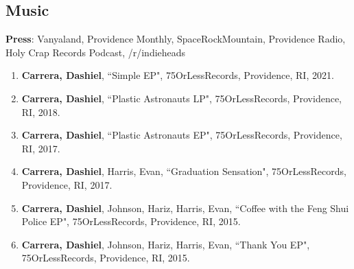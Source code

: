 

\subsection{Music}
\textbf{Press}: Vanyaland, Providence Monthly, SpaceRockMountain, Providence Radio, Holy Crap Records Podcast, /r/indieheads      \\
\begin{enumerate}
\item \textbf{Carrera, Dashiel}, ``Simple EP", 75OrLessRecords, Providence, RI, 2021. \\
\item \textbf{Carrera, Dashiel}, ``Plastic Astronauts LP", 75OrLessRecords, Providence, RI, 2018. \\
\item \textbf{Carrera, Dashiel}, ``Plastic Astronauts EP", 75OrLessRecords, Providence, RI, 2017. \\
\item \textbf{Carrera, Dashiel}, Harris, Evan, ``Graduation Sensation", 75OrLessRecords, Providence, RI, 2017. \\

\item \textbf{Carrera, Dashiel}, Johnson, Hariz, Harris, Evan, ``Coffee with the Feng Shui Police EP", 75OrLessRecords, Providence, RI, 2015. \\
        
\item \textbf{Carrera, Dashiel}, Johnson, Hariz, Harris, Evan, ``Thank You EP", 75OrLessRecords, Providence, RI, 2015. \\
 \end{enumerate}
